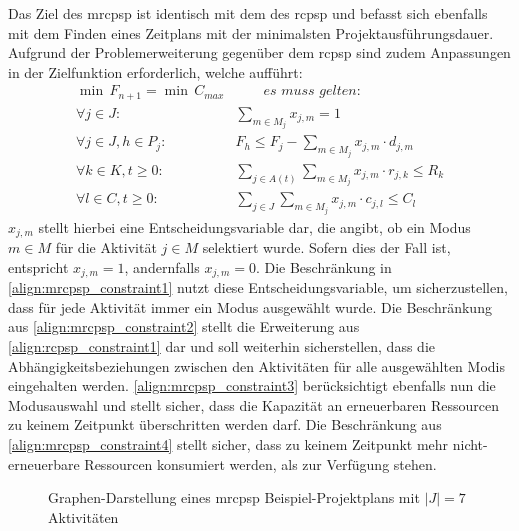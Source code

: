 Das Ziel des \ac{mrcpsp} ist identisch mit dem des \ac{rcpsp} und befasst sich ebenfalls mit dem Finden eines Zeitplans mit der minimalsten Projektausführungsdauer. Aufgrund der Problemerweiterung gegenüber dem \ac{rcpsp} sind zudem Anpassungen in der Zielfunktion erforderlich, welche \cite[vgl.][S. 597]{wuliang_improved_2014} aufführt: 
\begin{align}
    \min \, F_{n+1} = \min \, C_{max} & \qquad \textit{es muss gelten:} \label{align:mrcpsp_goal} \\
    \forall j \in J:\, & \sum_{m \in M_j} x_{j,m} = 1 \label{align:mrcpsp_constraint1}\\
    \forall j \in J, h \in P_j:\, & F_h \leq  F_j - \sum_{m \in M_j} x_{j,m} \cdot d_{j,m} \label{align:mrcpsp_constraint2} \\
    \forall k \in K, t \geq 0:\, & \sum_{j \in A(t)} \sum_{m \in M_j} x_{j,m} \cdot r_{j,k} \leq R_k  \label{align:mrcpsp_constraint3}
    \\
    \forall l \in C, t \geq 0:\, & \sum_{j \in J} \sum_{m \in M_j} x_{j,m} \cdot c_{j,l} \leq C_l  \label{align:mrcpsp_constraint4} 
\end{align}
$x_{j,m}$ stellt hierbei eine Entscheidungsvariable dar, die angibt, ob ein Modus $m \in M$ für die Aktivität $j \in M$ selektiert wurde. Sofern dies der Fall ist, entspricht $x_{j,m} = 1$, andernfalls $x_{j,m} = 0$. Die Beschränkung in \ref{align:mrcpsp_constraint1} nutzt diese Entscheidungsvariable, um sicherzustellen, dass für jede Aktivität immer ein Modus ausgewählt wurde. Die Beschränkung aus  \ref{align:mrcpsp_constraint2} stellt die Erweiterung aus \ref{align:rcpsp_constraint1} dar und soll weiterhin sicherstellen, dass die Abhängigkeitsbeziehungen zwischen den Aktivitäten für alle ausgewählten Modis eingehalten werden. \ref{align:mrcpsp_constraint3} berücksichtigt ebenfalls nun die Modusauswahl und stellt sicher, dass die Kapazität an erneuerbaren Ressourcen zu keinem Zeitpunkt überschritten werden darf. Die Beschränkung aus \ref{align:mrcpsp_constraint4} stellt sicher, dass zu keinem Zeitpunkt mehr nicht-erneuerbare Ressourcen konsumiert werden, als zur Verfügung stehen. \\

\begin{figure}[H]
    \centering
    \noindent{}
    \caption{Graphen-Darstellung eines \ac{mrcpsp} Beispiel-Projektplans mit $|J| = 7$ Aktivitäten} 
    \label{img:example_mrcpsp}
\end{figure}

